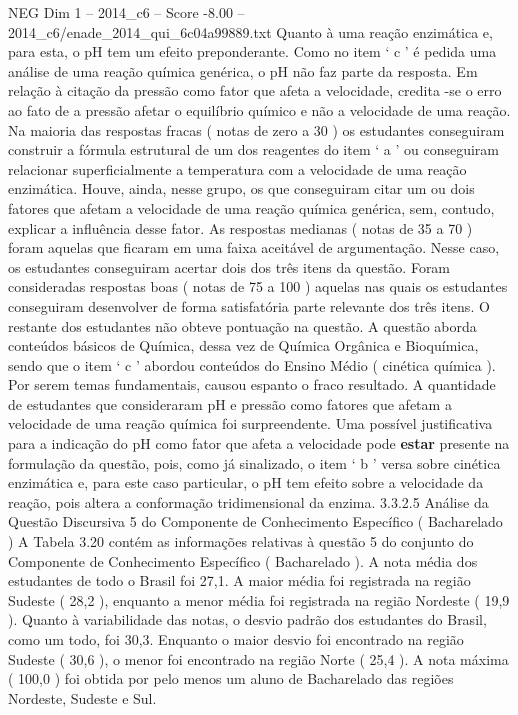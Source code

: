 \begin{textsample}{NEG Dim 1 – 2014\_c6 – Score -8.00 – 2014\_c6/enade\_2014\_qui\_6c04a99889.txt}
Quanto à uma reação enzimática e, para esta, o pH tem um efeito preponderante.
Como no item ‘ c ’ é pedida uma análise de uma reação química genérica, o pH não faz parte da resposta.
Em relação à citação da pressão como fator que afeta a velocidade, credita -se o erro ao fato de a pressão afetar o equilíbrio químico e não a velocidade de uma reação.
Na maioria das respostas fracas ( notas de zero a 30 ) os estudantes conseguiram construir a fórmula estrutural de um dos reagentes do item ‘ a ’ ou conseguiram relacionar superficialmente a temperatura com a velocidade de uma reação enzimática.
Houve, ainda, nesse grupo, os que conseguiram citar um ou dois fatores que afetam a velocidade de uma reação química genérica, sem, contudo, explicar a influência desse fator.
As respostas medianas ( notas de 35 a 70 ) foram aquelas que ficaram em uma faixa aceitável de argumentação.
Nesse caso, os estudantes conseguiram acertar dois dos três itens da questão.
Foram consideradas respostas boas ( notas de 75 a 100 ) aquelas nas quais os estudantes conseguiram desenvolver de forma satisfatória parte relevante dos três itens.
O restante dos estudantes não obteve pontuação na questão.
A questão aborda conteúdos básicos de Química, dessa vez de Química Orgânica e Bioquímica, sendo que o item ‘ c ’ abordou conteúdos do Ensino Médio ( cinética química ).
Por serem temas fundamentais, causou espanto o fraco resultado.
A quantidade de estudantes que consideraram pH e pressão como fatores que afetam a velocidade de uma reação química foi surpreendente.
Uma possível justificativa para a indicação do pH como fator que afeta a velocidade pode \textbf{estar} presente na formulação da questão, pois, como já sinalizado, o item ‘ b ’ versa sobre cinética enzimática e, para este caso particular, o pH tem efeito sobre a velocidade da reação, pois altera a conformação tridimensional da enzima. 3.3.2.5 Análise da Questão Discursiva 5 do Componente de Conhecimento Específico ( Bacharelado ) A Tabela 3.20 contém as informações relativas à questão 5 do conjunto do Componente de Conhecimento Específico ( Bacharelado ).
A nota média dos estudantes de todo o Brasil foi 27,1.
A maior média foi registrada na região Sudeste ( 28,2 ), enquanto a menor média foi registrada na região Nordeste ( 19,9 ).
Quanto à variabilidade das notas, o desvio padrão dos estudantes do Brasil, como um todo, foi 30,3.
Enquanto o maior desvio foi encontrado na região Sudeste ( 30,6 ), o menor foi encontrado na região Norte ( 25,4 ).
A nota máxima ( 100,0 ) foi obtida por pelo menos um aluno de Bacharelado das regiões Nordeste, Sudeste e Sul.

\end{textsample}
